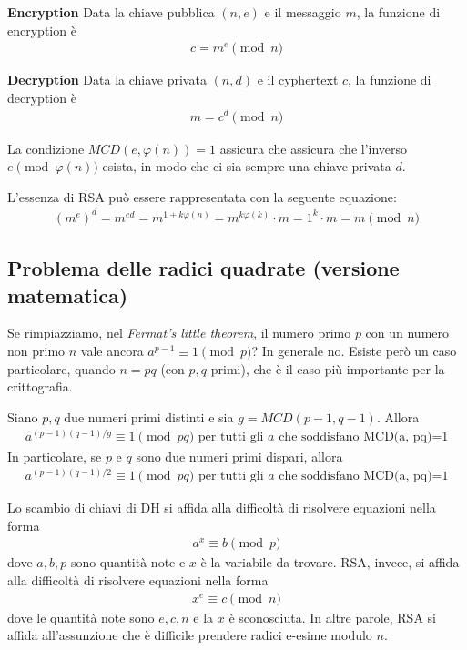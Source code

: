 \noindent \textbf{Encryption}
Data la chiave pubblica $(n, e)$ e il messaggio $m$, la funzione di encryption è
\begin{align*}
    c = m^e \pmod n
\end{align*}

\noindent \textbf{Decryption}
Data la chiave privata $(n, d)$ e il cyphertext $c$, la funzione di decryption è
\begin{align*}
    m = c^d \pmod n
\end{align*}

\noindent La condizione $MCD(e, \varphi(n)) = 1$ assicura che assicura che l'inverso $e \pmod{\varphi(n)}$ esista, in modo che ci sia sempre una chiave privata $d$.

\noindent L'essenza di RSA può essere rappresentata con la seguente equazione:
\begin{align*}
    (m^e)^d = m^{ed} = m^{1+ k\varphi(n)} = m^{k\varphi(k)} \cdot m = 1^k \cdot m = m \pmod n
 \end{align*}
 
\subsection{Problema delle radici quadrate (versione matematica)}
Se rimpiazziamo, nel \textit{Fermat’s little theorem}, il numero primo $p$ con un numero non primo $n$ vale ancora $a^{p-1}\equiv 1 \pmod p$? In generale no. Esiste però un caso particolare, quando $n = pq$ (con $p, q$ primi), che è il caso più importante per la crittografia. 
        
\begin{theorem}
    Siano \(p, q\) due numeri primi distinti e sia $g = MCD(p-1, q-1)$. Allora
    \begin{align*}
        a^{(p-1)(q-1)/g} \equiv 1 \pmod {pq} \text{ per tutti gli $a$ che soddisfano MCD(a, pq)=1}
    \end{align*}
    \noindent In particolare, se $p$ e $q$ sono due numeri primi dispari, allora 
    \begin{align*}
        a^{(p-1)(q-1)/2} \equiv 1 \pmod {pq} \text{ per tutti gli $a$ che soddisfano MCD(a, pq)=1}
    \end{align*}
\end{theorem}

\noindent Lo scambio di chiavi di DH si affida alla difficoltà di risolvere equazioni nella forma 
\begin{align*}
    a^x \equiv b \pmod p
\end{align*} 
\noindent dove $a, b, p$ sono quantità note e $x$ è la variabile da trovare. RSA, invece, si affida alla difficoltà di risolvere equazioni nella forma
\begin{align*}
    x^e \equiv c \pmod n
\end{align*}
\noindent dove le quantità note sono $e, c, n$ e la $x$ è sconosciuta. In altre parole, RSA si affida all'assunzione che è difficile prendere radici e-esime modulo $n$. 

